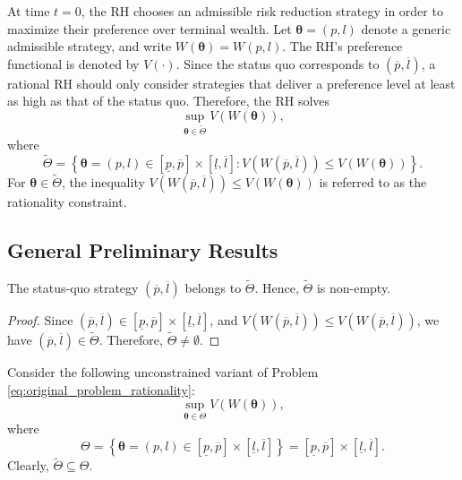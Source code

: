 \documentclass[a4paper,12pt]{article}
\begin{document}
At time $t=0$, the RH chooses an admissible risk reduction strategy in order to maximize their preference over terminal wealth. Let ${\bm\theta}=(p,l)$ denote a generic admissible strategy, and write $W\left({\bm\theta}\right)=W\left(p,l\right)$. The RH's preference functional is denoted by $V\left(\cdot\right)$. Since the status quo corresponds to $\left(\overline{p},\overline{l}\right)$, a rational RH should only consider strategies that deliver a preference level at least as high as that of the status quo. Therefore, the RH solves
\begin{equation}
\sup_{{\bm\theta}\in\tilde{\Theta}}V\left(W\left({\bm\theta}\right)\right),
\label{eq:original_problem_rationality}
\end{equation}
where
\begin{equation}
\tilde{\Theta}=\left\{{\bm\theta}=\left(p,l\right)\in\left[\underline{p},\overline{p}\right]\times\left[\underline{l},\overline{l}\right]:V\left(W\left(\overline{p},\overline{l}\right)\right)\leq V\left(W\left({\bm\theta}\right)\right)\right\}.
\label{eq:tilde_Theta}
\end{equation}
For ${\bm\theta}\in\tilde{\Theta}$, the inequality $V\left(W\left(\overline{p},\overline{l}\right)\right)\leq V\left(W\left({\bm\theta}\right)\right)$ is referred to as the rationality constraint.

\subsection{General Preliminary Results}

\begin{proposition}\label{prop:non-empty_convex}
The status-quo strategy $\left(\overline{p},\overline{l}\right)$ belongs to $\tilde{\Theta}$. Hence, $\tilde{\Theta}$ is non-empty.
\end{proposition}
\begin{proof}
Since $\left(\overline{p},\overline{l}\right)\in\left[\underline{p},\overline{p}\right]\times\left[\underline{l},\overline{l}\right]$, and $V\left(W\left(\overline{p},\overline{l}\right)\right)\leq V\left(W\left(\overline{p},\overline{l}\right)\right)$, we have $\left(\overline{p},\overline{l}\right)\in\tilde{\Theta}$. Therefore, $\tilde{\Theta}\neq\emptyset$.
\end{proof}
\noindent
Consider the following unconstrained variant of Problem \eqref{eq:original_problem_rationality}:
\begin{equation}
\sup_{{\bm\theta}\in\Theta}V\left(W\left({\bm\theta}\right)\right),
\label{eq:original_problem}
\end{equation}
where
\begin{equation}
\Theta=\left\{{\bm\theta}=\left(p,l\right)\in\left[\underline{p},\overline{p}\right]\times\left[\underline{l},\overline{l}\right]\right\}=\left[\underline{p},\overline{p}\right]\times\left[\underline{l},\overline{l}\right].
\label{eq:original_feasible_set}
\end{equation}
Clearly, $\tilde{\Theta}\subseteq\Theta$.
\end{document}
